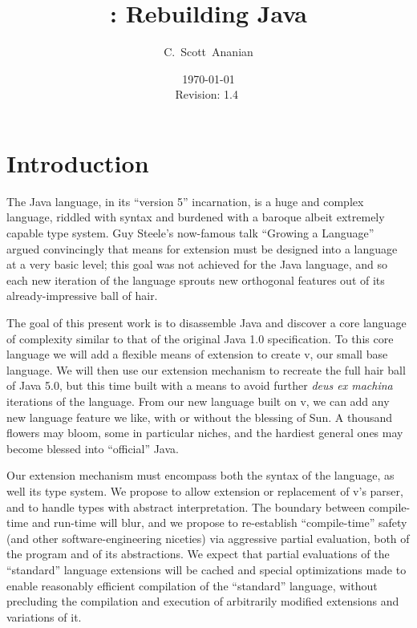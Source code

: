 \documentclass[11pt,notitlepage,twocolumn]{article}
\author{C.~Scott~Ananian}
\title{\vlang: Rebuilding Java}
\date{\today \\ $ $Revision: 1.4 $ $}
\newcommand{\vlang}{\textsf{v}\xspace}
\begin{document}

\maketitle

\section{Introduction}
The Java language, in its ``version 5'' incarnation, is a huge and
complex language, riddled with syntax and burdened with a baroque
albeit extremely capable type system.  Guy Steele's now-famous talk
``Growing a Language'' \cite{Steele99} argued convincingly that means
for extension must be designed into a language at a very basic level;
this goal was not achieved for the Java language, and so each new
iteration of the language sprouts new orthogonal features out of its
already-impressive ball of hair.

The goal of this present work is to disassemble Java and discover a
core language of complexity similar to that of the original Java
1.0 specification.  To this core language we will add a flexible means
of extension to create \vlang, our small base language.  We will then use
our extension mechanism to recreate the full hair ball of Java 5.0,
but this time built with a means to avoid further \emph{deus ex
  machina} iterations of the language.  From our new language built on
\vlang, we can add any new language feature we like, with or without the
blessing of Sun.  A thousand flowers may bloom, some in particular
niches, and the hardiest general ones may become blessed into
``official'' Java.

Our extension mechanism must encompass both the syntax of the
language, as well its type system.  We propose to allow extension or
replacement of \vlang's parser, and to handle types with abstract
interpretation.  The boundary between compile-time and run-time will
blur, and we propose to re-establish ``compile-time'' safety (and
other software-engineering niceties) via aggressive partial
evaluation, both of the program and of its abstractions.  We expect
that partial evaluations of the ``standard'' language extensions will
be cached and special optimizations made to enable reasonably
efficient compilation of the ``standard'' language, without precluding
the compilation and execution of arbitrarily modified extensions and
variations of it.
\end{document}
